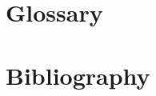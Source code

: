 \documentclass[10pt,twoside,twocolumn,openany,nomultitoc]{book}
\begin{document}
\section{Glossary}
\printglossaries


\section{Bibliography}
\begingroup
\let\clearpage\relax

    \nocite{*}

    \endgroup




\end{document}
